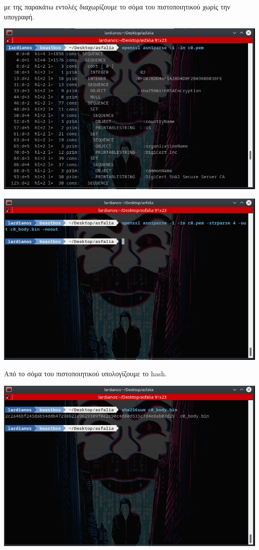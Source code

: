 \noindent
με της παρακάτω εντολές διαχωρίζουμε το σόμα του πιστοποιητικού χωρίς την υπογραφή.
\begin{center}
			\includegraphics[width=1\textwidth]{image/image36term6.PNG}		
\end{center}
\begin{center}
			\includegraphics[width=1\textwidth]{image/image36term7.PNG}		
\end{center}
\noindent
Από το σόμα του πιστοποιητικού υπολογίζουμε το hash.
\begin{center}
			\includegraphics[width=1\textwidth]{image/image36term8.PNG}		
\end{center}
